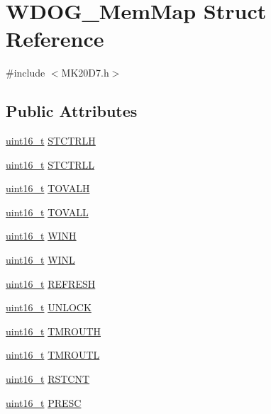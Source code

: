 \hypertarget{struct_w_d_o_g___mem_map}{}\section{W\+D\+O\+G\+\_\+\+Mem\+Map Struct Reference}
\label{struct_w_d_o_g___mem_map}


{\ttfamily \#include $<$M\+K20\+D7.\+h$>$}

\subsection*{Public Attributes}
\begin{DoxyCompactItemize}
\item 
\hyperlink{_p_e___types_8h_a1f1825b69244eb3ad2c7165ddc99c956}{uint16\+\_\+t} \hyperlink{struct_w_d_o_g___mem_map_ae48286fe7c8ceabfd9aa616e40b52a35}{S\+T\+C\+T\+R\+LH}
\item 
\hyperlink{_p_e___types_8h_a1f1825b69244eb3ad2c7165ddc99c956}{uint16\+\_\+t} \hyperlink{struct_w_d_o_g___mem_map_a0eb14eade4d91bd2f2f82910d633e0aa}{S\+T\+C\+T\+R\+LL}
\item 
\hyperlink{_p_e___types_8h_a1f1825b69244eb3ad2c7165ddc99c956}{uint16\+\_\+t} \hyperlink{struct_w_d_o_g___mem_map_ae5ac6a42d85914d2f739b5377734f87a}{T\+O\+V\+A\+LH}
\item 
\hyperlink{_p_e___types_8h_a1f1825b69244eb3ad2c7165ddc99c956}{uint16\+\_\+t} \hyperlink{struct_w_d_o_g___mem_map_a2ce5a77ef35f55b7f60a11757dbd758f}{T\+O\+V\+A\+LL}
\item 
\hyperlink{_p_e___types_8h_a1f1825b69244eb3ad2c7165ddc99c956}{uint16\+\_\+t} \hyperlink{struct_w_d_o_g___mem_map_a86589dc11cb4b7d3a00be9234372591f}{W\+I\+NH}
\item 
\hyperlink{_p_e___types_8h_a1f1825b69244eb3ad2c7165ddc99c956}{uint16\+\_\+t} \hyperlink{struct_w_d_o_g___mem_map_af238938251c1f5904a215c8a4ed1b74d}{W\+I\+NL}
\item 
\hyperlink{_p_e___types_8h_a1f1825b69244eb3ad2c7165ddc99c956}{uint16\+\_\+t} \hyperlink{struct_w_d_o_g___mem_map_a5dbb3963b38571b0de1d2db7bd89d46a}{R\+E\+F\+R\+E\+SH}
\item 
\hyperlink{_p_e___types_8h_a1f1825b69244eb3ad2c7165ddc99c956}{uint16\+\_\+t} \hyperlink{struct_w_d_o_g___mem_map_a78988c0aeb0693a231757a4cc164e1bf}{U\+N\+L\+O\+CK}
\item 
\hyperlink{_p_e___types_8h_a1f1825b69244eb3ad2c7165ddc99c956}{uint16\+\_\+t} \hyperlink{struct_w_d_o_g___mem_map_a47bce5f5c4ea1609ec9d0055e05e9b73}{T\+M\+R\+O\+U\+TH}
\item 
\hyperlink{_p_e___types_8h_a1f1825b69244eb3ad2c7165ddc99c956}{uint16\+\_\+t} \hyperlink{struct_w_d_o_g___mem_map_a873a6456ac56cb42a5a2ff66ddfefa3c}{T\+M\+R\+O\+U\+TL}
\item 
\hyperlink{_p_e___types_8h_a1f1825b69244eb3ad2c7165ddc99c956}{uint16\+\_\+t} \hyperlink{struct_w_d_o_g___mem_map_aad95a949933f4c578786a38a2ffeec4a}{R\+S\+T\+C\+NT}
\item 
\hyperlink{_p_e___types_8h_a1f1825b69244eb3ad2c7165ddc99c956}{uint16\+\_\+t} \hyperlink{struct_w_d_o_g___mem_map_a8d00541f19094160ea06d8c7ded60298}{P\+R\+E\+SC}
\end{DoxyCompactItemize}


